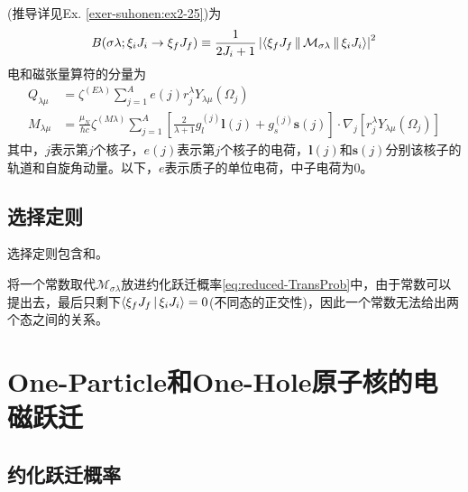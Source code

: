 (推导详见Ex. \ref{exer-suhonen:ex2-25})为
\begin{equation}
    B(\sigma\lambda; \xi_i J_i \rightarrow \xi_f J_f) \equiv \frac{1}{2J_i + 1} \left|\Braket{\xi_f J_f || \mathcal{M}_{\sigma\lambda} || \xi_i J_i}\right|^2
    \label{eq:reduced-TransProb}
\end{equation}
电和磁张量算符的分量为
\begin{align}
    Q_{\lambda\mu} &= \zeta^{(E\lambda)} \sum_{j = 1}^{A} e(j) r_j^{\lambda} Y_{\lambda\mu}(\Omega_{j}) \label{eq:mul-elec} \\
    M_{\lambda\mu} &= \frac{\mu_{N}}{\hbar c} \zeta^{(M\lambda)} \sum_{j = 1}^{A} \left[\frac{2}{\lambda+1}g_{l}^{(j)} \bm{l}(j) + g_{s}^{(j)}\bm{s}(j)\right] \cdot \nabla_j [r_j^\lambda Y_{\lambda\mu}(\Omega_j)]
\end{align}
其中，$j$表示第$j$个核子，$e(j)$表示第$j$个核子的电荷，$\bm{l}(j)$和$\bm{s}(j)$分别该核子的轨道和自旋角动量。以下，$e$表示质子的单位电荷，中子电荷为0。

\subsection{选择定则}
选择定则包含和。
\begin{question}[一个常数无法连接两个不同的原子核态。]
    将一个常数取代$\mathcal{M}_{\sigma\lambda}$放进约化跃迁概率\cref{eq:reduced-TransProb}中，由于常数可以提出去，最后只剩下$\Braket{\xi_f J_f |\xi_i J_i} = 0$(不同态的正交性)，因此一个常数无法给出两个态之间的关系。
\end{question}


\section{One-Particle和One-Hole原子核的电磁跃迁}

\subsection{约化跃迁概率}
